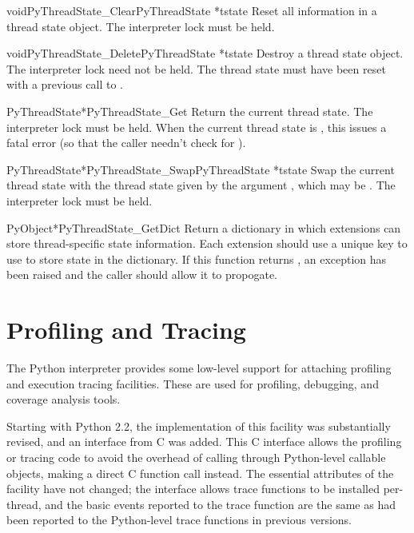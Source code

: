\documentclass{manual}
\begin{document}
\begin{cfuncdesc}{void}{PyThreadState_Clear}{PyThreadState *tstate}
Reset all information in a thread state object.  The interpreter lock
must be held.
\end{cfuncdesc}

\begin{cfuncdesc}{void}{PyThreadState_Delete}{PyThreadState *tstate}
Destroy a thread state object.  The interpreter lock need not be
held.  The thread state must have been reset with a previous
call to .
\end{cfuncdesc}

\begin{cfuncdesc}{PyThreadState*}{PyThreadState_Get}{}
Return the current thread state.  The interpreter lock must be held.
When the current thread state is \NULL{}, this issues a fatal
error (so that the caller needn't check for \NULL{}).
\end{cfuncdesc}

\begin{cfuncdesc}{PyThreadState*}{PyThreadState_Swap}{PyThreadState *tstate}
Swap the current thread state with the thread state given by the
argument , which may be \NULL{}.  The interpreter lock
must be held.
\end{cfuncdesc}

\begin{cfuncdesc}{PyObject*}{PyThreadState_GetDict}{}
Return a dictionary in which extensions can store thread-specific
state information.  Each extension should use a unique key to use to
store state in the dictionary.  If this function returns \NULL, an
exception has been raised and the caller should allow it to
propogate.
\end{cfuncdesc}


\section{Profiling and Tracing \label{profiling}}


The Python interpreter provides some low-level support for attaching
profiling and execution tracing facilities.  These are used for
profiling, debugging, and coverage analysis tools.

Starting with Python 2.2, the implementation of this facility was
substantially revised, and an interface from C was added.  This C
interface allows the profiling or tracing code to avoid the overhead
of calling through Python-level callable objects, making a direct C
function call instead.  The essential attributes of the facility have
not changed; the interface allows trace functions to be installed
per-thread, and the basic events reported to the trace function are
the same as had been reported to the Python-level trace functions in
previous versions.
\end{document}
